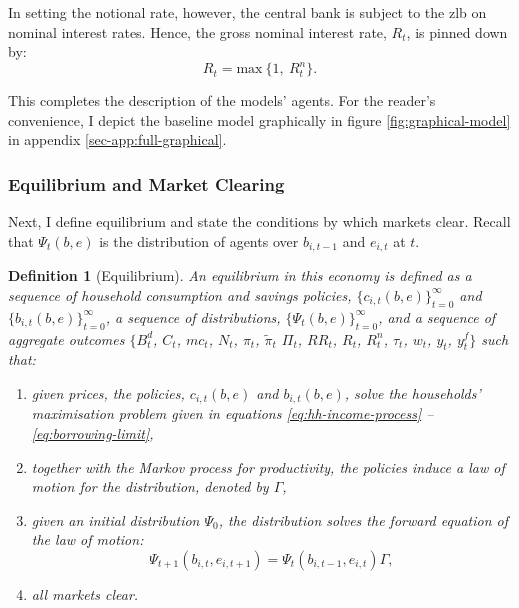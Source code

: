 \documentclass[a4paper,12pt]{article} %
\numberwithin{equation}{section} %
\numberwithin{figure}{section}
\numberwithin{table}{section}
\newtheorem{definition}{Definition}
\begin{document}
In setting the notional rate, however, the central bank is subject to the \Gls{zlb} on nominal interest rates. Hence, the gross nominal interest rate, $R_t$, is pinned down by: %
\begin{equation}
    R_t = \text{max} \ \{ 1, \ R_{t}^n \}. \label{eq:zlb}
\end{equation}

This completes the description of the models' agents. For the reader's convenience, I depict the baseline model graphically in figure \ref{fig:graphical-model} in appendix \ref{sec-app:full-graphical}.

\subsubsection{Equilibrium and Market Clearing}
\label{sec:model-eq}

Next, I define equilibrium and state the conditions by which markets clear. Recall that $\Psi_t (b,e)$ is the distribution of agents over $b_{i,t-1}$ and $e_{i,t}$ at $t$.

\begin{definition}[Equilibrium]
\label{def:eq}
An equilibrium in this economy is defined as a sequence of household consumption and savings policies, $\{ c_{i,t} (b, e) \}_{t=0}^{\infty}$ and $\{ b_{i,t} (b, e) \}_{t=0}^{\infty}$, a sequence of distributions, $\{ \Psi_t (b,e) \}_{t=0}^{\infty} $, and a sequence of aggregate outcomes $\{ B_t^d$, $C_t$, $mc_t$, $N_t$, $\pi_t$, $\tilde{\pi}_t$ $\Pi_t$, $RR_t$, $R_t$, $R_t^n$, $\tau_t$, $w_t$, $y_t$, $y_t^f \}$ such that:
\begin{enumerate}
    \item given prices, the policies, $c_{i,t} (b, e)$ and $b_{i,t} (b, e)$, solve the households' maximisation problem given in equations \eqref{eq:hh-income-process} -- \eqref{eq:borrowing-limit},
    \item together with the Markov process for productivity, the policies induce a law of motion for the distribution, denoted by $\Gamma$,
    \item given an initial distribution $\Psi_0$, the distribution solves the forward equation of the law of motion:
    \begin{equation*}
        \Psi_{t+1} (b_{i,t},e_{i,t+1}) = \Psi_{t} (b_{i,t-1},e_{i,t}) \Gamma,
    \end{equation*}
    \item all markets clear.
\end{enumerate}
\end{definition}
\end{document}
